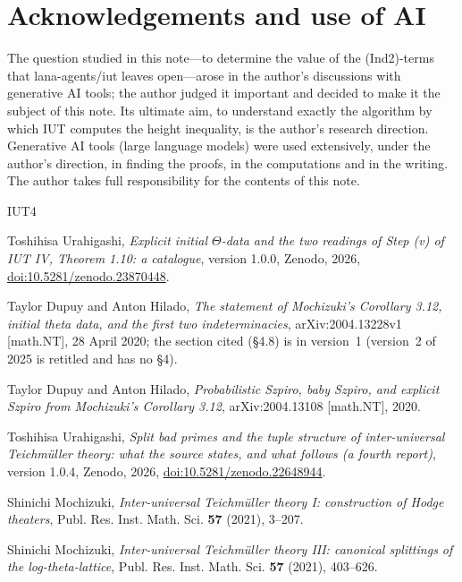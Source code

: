 \documentclass[11pt,a4paper]{article}
\theoremstyle{plain}
\theoremstyle{definition}
\theoremstyle{remark}
\begin{document}
\section*{Acknowledgements and use of AI}
The question studied in this note---to determine the value of the (Ind2)-terms that lana-agents/iut leaves
open---arose in the author's discussions with generative AI tools; the author judged it important and decided to make
it the subject of this note. Its ultimate aim, to understand exactly the algorithm by which IUT computes the height
inequality, is the author's research direction. Generative AI tools (large language models) were used extensively,
under the author's direction, in finding the proofs, in the computations and in the writing. The author takes full
responsibility for the contents of this note.

\begin{thebibliography}{IUT4}\raggedright
{}
Toshihisa Urahigashi, \emph{Explicit initial $\Theta$-data and the two readings of Step (v) of IUT IV, Theorem 1.10:
a catalogue}, version 1.0.0, Zenodo, 2026, \href{https://doi.org/10.5281/zenodo.23870448}{doi:10.5281/zenodo.23870448}.

Taylor Dupuy and Anton Hilado, \emph{The statement of {M}ochizuki's {C}orollary 3.12, initial theta data, and the
first two indeterminacies}, arXiv:2004.13228v1 [math.NT], 28 April 2020; the section cited (\S4.8) is in version~1
(version~2 of 2025 is retitled and has no \S4).

Taylor Dupuy and Anton Hilado, \emph{Probabilistic {S}zpiro, baby {S}zpiro, and explicit {S}zpiro from {M}ochizuki's
{C}orollary 3.12}, arXiv:2004.13108 [math.NT], 2020.

Toshihisa Urahigashi, \emph{Split bad primes and the tuple structure of inter-universal {T}eichm\"uller theory: what
the source states, and what follows (a fourth report)}, version 1.0.4, Zenodo, 2026,
\href{https://doi.org/10.5281/zenodo.22648944}{doi:10.5281/zenodo.22648944}.

Shinichi Mochizuki, \emph{Inter-universal {T}eichm\"uller theory {I}: construction of {H}odge theaters}, Publ. Res.
Inst. Math. Sci. \textbf{57} (2021), 3--207.

Shinichi Mochizuki, \emph{Inter-universal {T}eichm\"uller theory {III}: canonical splittings of the log-theta-lattice},
Publ. Res. Inst. Math. Sci. \textbf{57} (2021), 403--626.


\end{thebibliography}
\end{document}

